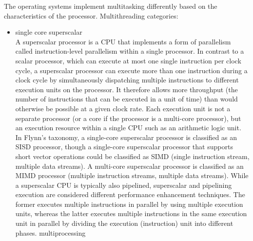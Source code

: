 The operating systems implement multitasking differently based on the characteristics of the processor.
Multithreading categories:
\begin{itemize}
    \item single core
        \subitem superscalar\\
    A superscalar processor is a CPU that implements a form of parallelism called instruction-level parallelism within a
    single processor.
    In contrast to a scalar processor, which can execute at most one single instruction per clock
    cycle, a superscalar processor can execute more than one instruction during a clock cycle by simultaneously
    dispatching multiple instructions to different execution units on the processor.
    It therefore allows more throughput (the number of instructions that can be executed in a unit of time) than would
    otherwise be possible at a given clock rate.
    Each execution unit is not a separate processor (or a core if the processor is a multi-core processor), but an
    execution resource within a single CPU such as an arithmetic logic unit.
    In Flynn's taxonomy, a single-core superscalar processor is classified as an SISD processor, though a single-core
    superscalar processor that supports short vector operations could be classified as SIMD (single instruction stream,
    multiple data streams).
    A multi-core superscalar processor is classified as an MIMD processor (multiple instruction streams, multiple data streams).
    While a superscalar CPU is typically also pipelined, superscalar and pipelining execution are considered different performance
    enhancement techniques.
    The former executes multiple instructions in parallel by using multiple execution units, whereas the latter executes
    multiple instructions in the same execution unit in parallel by dividing the execution (instruction) unit into
    different phases.
        \subitem multiprocessing\\


\end{itemize}
